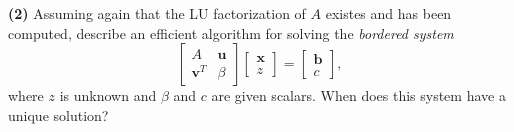 \documentclass[a4paper,11pt]{article}
\begin{document}
\noindent \textbf{(2)} Assuming again that the LU factorization of $A$ existes and has been computed, describe an efficient algorithm for solving the \textit{bordered system}
\begin{equation}\label{key}
	\begin{bmatrix}
		A &  \textbf{u} \\ 
		\textbf{v}^T & \beta 
	\end{bmatrix}
	\begin{bmatrix}
		\textbf{x} \\ 
		z
	\end{bmatrix}
	=
	\begin{bmatrix}
		\textbf{b} \\ 
		c
	\end{bmatrix},
\end{equation}
where $z$ is unknown and $\beta$ and $c$ are given scalars. When does this system have a unique solution?
\end{document}
